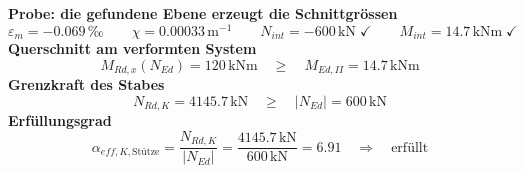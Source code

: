 \documentclass[11pt,a4paper]{article}
\begin{document}
\noindent\textbf{Probe: die gefundene Ebene erzeugt die Schnittgrössen}
\begin{equation*}
\varepsilon_m = -0.069\,\text{‰} \qquad \chi = 0.00033\,\mathrm{m}^{-1} \qquad N_{int} = -600\,\mathrm{kN} \;\checkmark \qquad M_{int} = 14.7\,\mathrm{kNm} \;\checkmark
\end{equation*}
\noindent\textbf{Querschnitt am verformten System}
\begin{equation*}
M_{Rd,x}(N_{Ed}) = 120\,\mathrm{kNm} \quad \ge \quad M_{Ed,II} = 14.7\,\mathrm{kNm}
\end{equation*}
\noindent\textbf{Grenzkraft des Stabes}
\begin{equation*}
N_{Rd,K} = 4145.7\,\mathrm{kN} \quad \ge \quad \left|N_{Ed}\right| = 600\,\mathrm{kN}
\end{equation*}
\noindent\textbf{Erfüllungsgrad}
\begin{equation*}
\alpha_{eff,K,\text{Stütze}} = \frac{N_{Rd,K}}{\left|N_{Ed}\right|} = \frac{4145.7\,\mathrm{kN}}{600\,\mathrm{kN}} = 6.91 \quad \Rightarrow \quad \text{erfüllt}
\end{equation*}
\end{document}
